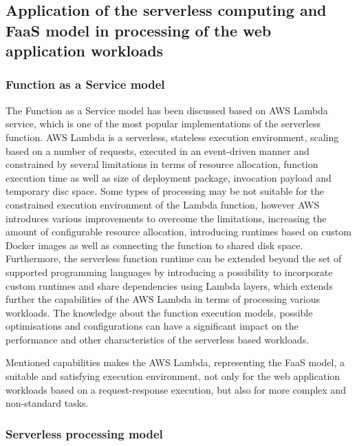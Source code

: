\subsection{Application of the serverless computing and FaaS model in processing of the web application workloads}

\subsubsection{Function as a Service model}

The Function as a Service model has been discussed based on AWS Lambda service, which is one of the most popular implementations of the serverless function. AWS Lambda is a serverless, stateless execution environment, scaling based on a number of requests, executed in an event-driven manner and constrained by several limitations in terms of resource allocation, function execution time as well as size of deployment package, invocation payload and temporary disc space.
Some types of processing may be not suitable for the constrained execution environment of the Lambda function, however AWS introduces various improvements to overcome the limitations, increasing the amount of configurable resource allocation, introducing runtimes based on custom Docker images as well as connecting the function to shared disk space.
Furthermore, the serverless function runtime can be extended beyond the set of supported programming languages by introducing a possibility to incorporate custom runtimes and share dependencies using Lambda layers, which extends further the capabilities of the AWS Lambda in terms of processing various workloads.
The knowledge about the function execution models, possible optimisations and configurations can have a significant impact on the performance and other characteristics of the serverless based workloads.

Mentioned capabilities makes the AWS Lambda, representing the FaaS model, a suitable and satisfying execution environment, not only for the web application workloads based on a request-response execution, but also for more complex and non-standard tasks.

\subsubsection{Serverless processing model}

